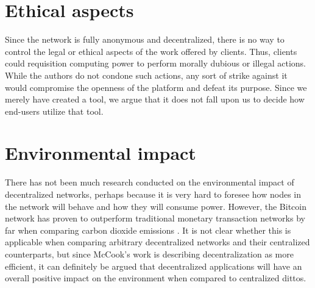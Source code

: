 \section{Ethical aspects}
Since the network is fully anonymous and decentralized, there is no way to control the legal or ethical aspects of the work offered by clients. Thus, clients could requisition computing power to perform morally dubious or illegal actions. While the authors do not condone such actions, any sort of strike against it would compromise the openness of the platform and defeat its purpose. Since we merely have created a tool, we argue that it does not fall upon us to decide how end-users utilize that tool.

\section{Environmental impact}
There has not been much research conducted on the environmental impact of decentralized networks, perhaps because it is very hard to foresee how nodes in the network will behave and how they will consume power. However, the Bitcoin network has proven to outperform traditional monetary transaction networks by far when comparing carbon dioxide emissions \cite{cook}. It is not clear whether this is applicable when comparing arbitrary decentralized networks and their centralized counterparts, but since McCook's work is describing decentralization as more efficient, it can definitely be argued that decentralized applications will have an overall positive impact on the environment when compared to centralized dittos.
